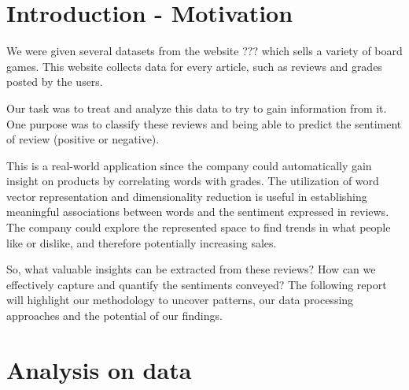 \documentclass{article}
\begin{document}
\tableofcontents

\newpage
\section{Introduction - Motivation}

We were given several datasets from the website ??? which sells a variety of board games. This website collects data for every article, such as reviews and grades posted by the users. 

Our task was to treat and analyze this data to try to gain information from it. One purpose was to classify these reviews and being able to predict the sentiment of review (positive or negative). 

This is a real-world application since the company could automatically gain insight on products by correlating words with grades.
The utilization of word vector representation and dimensionality reduction is useful in establishing meaningful associations between words and the sentiment expressed in reviews. The company could explore the represented space to find trends in what people like or dislike, and therefore potentially increasing sales.

So, what valuable insights can be extracted from these reviews? How can we effectively capture and quantify the sentiments conveyed?
The following report will highlight our methodology to uncover patterns, our data processing approaches and the potential of our findings.  
\newpage
\section{Analysis on data}
\end{document}

